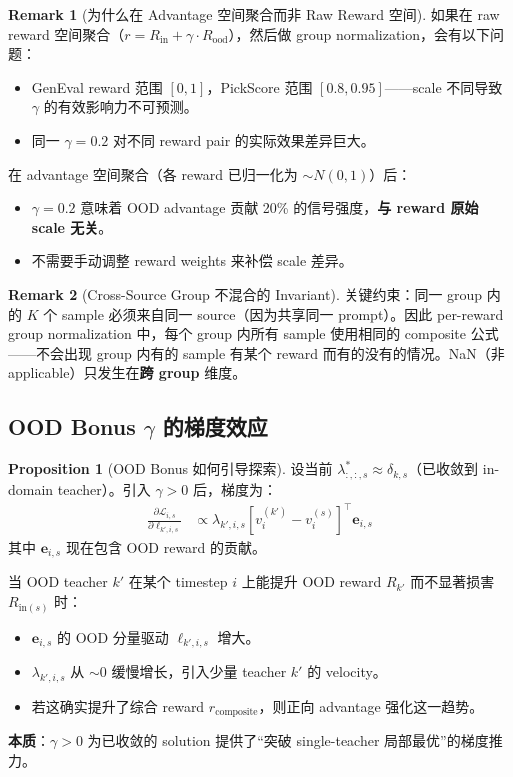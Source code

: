 \documentclass[11pt,a4paper]{article}
\newcommand{\loss}{\mathcal{L}}
\theoremstyle{definition}
\newtheorem{remark}{Remark}
\newtheorem{proposition}{Proposition}
\begin{document}
\begin{remark}[为什么在 Advantage 空间聚合而非 Raw Reward 空间]
如果在 raw reward 空间聚合（$r = R_{\mathrm{in}} + \gamma \cdot R_{\mathrm{ood}}$），然后做 group normalization，会有以下问题：
\begin{itemize}[leftmargin=1.5em]
\item GenEval reward 范围 $[0, 1]$，PickScore 范围 $[0.8, 0.95]$——scale 不同导致 $\gamma$ 的有效影响力不可预测。
\item 同一 $\gamma = 0.2$ 对不同 reward pair 的实际效果差异巨大。
\end{itemize}
在 advantage 空间聚合（各 reward 已归一化为 $\sim N(0, 1)$）后：
\begin{itemize}[leftmargin=1.5em]
\item $\gamma = 0.2$ 意味着 OOD advantage 贡献 20\% 的信号强度，\textbf{与 reward 原始 scale 无关}。
\item 不需要手动调整 reward weights 来补偿 scale 差异。
\end{itemize}
\end{remark}

\begin{remark}[Cross-Source Group 不混合的 Invariant]
关键约束：同一 group 内的 $K$ 个 sample 必须来自同一 source（因为共享同一 prompt）。因此 per-reward group normalization 中，每个 group 内所有 sample 使用相同的 composite 公式——不会出现 group 内有的 sample 有某个 reward 而有的没有的情况。NaN（非 applicable）只发生在\textbf{跨 group} 维度。
\end{remark}

\subsection{OOD Bonus $\gamma$ 的梯度效应}

\begin{proposition}[OOD Bonus 如何引导探索]
\label{prop:ood_bonus}
设当前 $\lambda^*_{:,:,s} \approx \delta_{k,s}$（已收敛到 in-domain teacher）。引入 $\gamma > 0$ 后，梯度为：
\begin{align}
\frac{\partial \loss_{i,s}}{\partial \ell_{k',i,s}} &\propto \lambda_{k',i,s}\left[v^{(k')}_i - v^{(s)}_i\right]^\top \mathbf{e}_{i,s}
\end{align}
其中 $\mathbf{e}_{i,s}$ 现在包含 OOD reward 的贡献。

当 OOD teacher $k'$ 在某个 timestep $i$ 上能提升 OOD reward $R_{k'}$ 而不显著损害 $R_{\mathrm{in}(s)}$ 时：
\begin{itemize}[leftmargin=1.5em]
\item $\mathbf{e}_{i,s}$ 的 OOD 分量驱动 $\ell_{k',i,s}$ 增大。
\item $\lambda_{k',i,s}$ 从 $\sim 0$ 缓慢增长，引入少量 teacher $k'$ 的 velocity。
\item 若这确实提升了综合 reward $r_{\mathrm{composite}}$，则正向 advantage 强化这一趋势。
\end{itemize}

\textbf{本质}：$\gamma > 0$ 为已收敛的 solution 提供了``突破 single-teacher 局部最优''的梯度推力。
\end{proposition}
\end{document}
